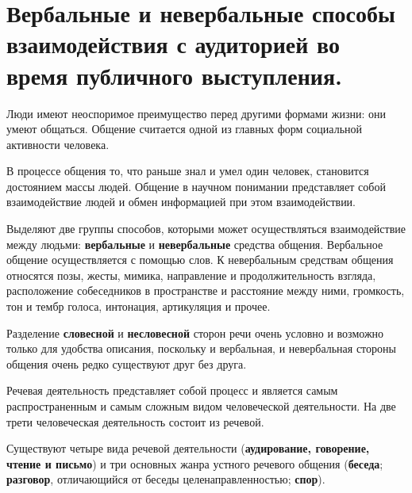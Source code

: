 \section{Вербальные и невербальные способы взаимодействия с аудиторией во время публичного выступления.}

\hspace{\parindent}Люди имеют неоспоримое преимущество перед другими формами жизни: они умеют общаться. 
Общение считается одной из главных форм социальной активности человека. 

 В процессе общения то, что раньше знал и умел один человек, становится достоянием массы
 людей. 
 Общение в научном понимании представляет собой взаимодействие людей и обмен
 информацией при этом взаимодействии.

 Выделяют две группы способов, которыми может осуществляться взаимодействие между людьми: \textbf{вербальные} и \textbf{невербальные} средства общения. Вербальное общение осуществляется с помощью слов. К невербальным средствам общения относятся позы, жесты, мимика, направление и продолжительность взгляда, расположение собеседников в пространстве и расстояние между ними, громкость, тон и тембр голоса, интонация,
 артикуляция и прочее.
 
 Разделение \textbf{словесной} и \textbf{несловесной} сторон речи очень условно и возможно только для удобства описания, поскольку и вербальная, и невербальная стороны общения очень редко существуют друг без друга.
 
 Речевая деятельность представляет собой процесс и является самым распространенным и самым сложным видом человеческой деятельности. На две трети человеческая деятельность
 состоит из речевой.

 Существуют четыре вида речевой деятельности (\textbf{аудирование, говорение, чтение и письмо}) и три основных жанра устного речевого общения (\textbf{беседа}; \textbf{разговор}, отличающийся от беседы целенаправленностью; \textbf{спор}).

